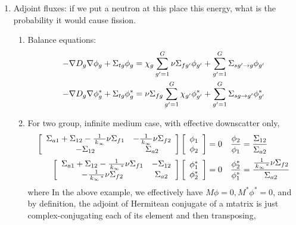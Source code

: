 \documentclass{school-22.211-notes}
\begin{document}
\begin{enumerate}
\item Adjoint fluxes: if we put a neutron at this place this energy, what is the probability it would cause fission.
  \begin{enumerate}
  \item Balance equations:
    \begin{align}
      -\nabla D_g  \nabla \phi_g + \Sigma_{tg} \phi_g &= \chi_g \displaystyle\sum_{g'=1}^G \nu \Sigma_{fg'}  \phi_{g'} + \displaystyle\sum_{g'=1}^G \Sigma_{sg'\to g} \phi_{g'} \\
      -\nabla D_g  \nabla \phi_g^* + \Sigma_{tg}  \phi_g^* &= \nu \Sigma_{fg}  \displaystyle\sum_{g'=1}^G  \chi_{g'} \phi_{g'}^*  + \displaystyle\sum_{g'=1}^G \Sigma_{sg\to g'}  \phi_{g'}^*
    \end{align}

  \item For two group, infinite medium case, with effective downscatter only, 
    \begin{align}
      \left[ \begin{array}{cc}
          \Sigma_{a1} + \Sigma_{12} - \frac{1}{\left. k_{\infty} \right.} \nu \Sigma_{f1} & - \frac{1}{\left. k_{\infty} \right.} \nu \Sigma_{f2} \\
          - \Sigma_{12} & \Sigma_{a2} \end{array} \right] 
      \left[ \begin{array}{c}
          \phi_1 \\ \phi_2 \end{array} \right] &= 0  
      &\frac{\phi_2}{\phi_1} &= \frac{\Sigma_{12}}{\Sigma_{a2}}   \\
      \left[ \begin{array}{cc}
          \Sigma_{a1} + \Sigma_{12} - \frac{1}{\left. k_{\infty} \right.^*} \nu \Sigma_{f1} & - \Sigma_{12} \\
          - \frac{1}{\left. k_{\infty} \right.^*} \nu \Sigma_{f2} & \Sigma_{a2} \end{array} \right] 
      \left[ \begin{array}{c}
          \phi_1^* \\ \phi_2^* \end{array} \right] &= 0  
      &\frac{\phi_2^*}{\phi_1^*} &= \frac{\frac{1}{\left. k_{\infty} \right.^*} \nu \Sigma_{f2}}{\Sigma_{a2}}  
    \end{align}
    where 
    In the above example, we effectively have $M \phi = 0, M^* \phi^* = 0$, and by definition, the adjoint of Hermitean conjugate of a mtatrix is just complex-conjugating each of its element and then transposing, 
 

\end{enumerate}
\end{enumerate}
\end{document}
